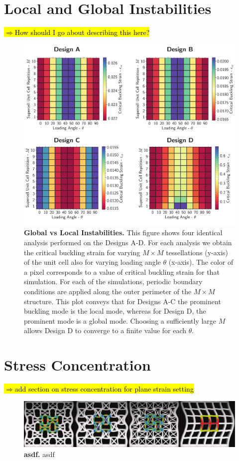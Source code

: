 \documentclass[10pt,twoside]{fernandes_supp}
\newcommand{\mf}[1]{\noindent\color{color2}\sethlcolor{cyan}\hl{$\Longrightarrow$#1}\normalcolor}
\begin{document}
\section{Local and Global Instabilities}
\mf{How should I go about describing this here?}
\begin{figure}
	\centering
	\includegraphics[width=0.7\linewidth]{SFig12.pdf}
	\caption{{\bf Global vs Local Instabilities.} This figure shows four identical analysis performed on the Designs A-D. For each analysis we obtain the critical buckling strain for varying $M\times M$ tessellations (y-axis) of the unit cell also for varying loading angle $\theta$ (x-axis). The color of a pixel corresponds to a value of critical buckling strain for that simulation. For each of the simulations, periodic boundary conditions are applied along the outer perimeter of the $M\times M$ structure. This plot conveys that for Designs A-C the prominent buckling mode is the local mode, whereas for Design D, the prominent mode is a global mode. Choosing a sufficiently large $M$ allows Design D to converge to a finite value for each $\theta$.}
	\label{DomainSize}
\end{figure}

\section{Stress Concentration}
\mf{add section on stress concentration for plane strain setting}


%
% 



\begin{figure}
	\centering
	\includegraphics[width=0.9\linewidth]{SFig13.pdf}
	\caption{{\bf asdf.} asdf}
	\label{asdfa}
\end{figure}
\end{document}
